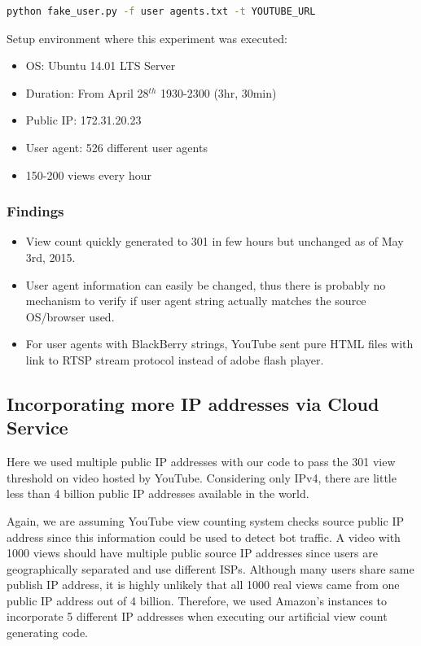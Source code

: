 \documentclass[conference]{IEEEtran}
\begin{document}
\begin{lstlisting}[frame=single, language=bash]
python fake_user.py -f user agents.txt -t YOUTUBE_URL
\end{lstlisting}

Setup environment where this experiment was executed:
\begin{itemize}
  \setlength\itemsep{-0.1em}
  \item OS: Ubuntu 14.01 LTS Server
  \item Duration: From April 28$^{th}$ 1930-2300 (3hr, 30min)
  \item Public IP: 172.31.20.23
  \item User agent: 526 different user agents
  \item 150-200 views every hour
\end{itemize}

\subsubsection*{Findings}
\begin{itemize}
  \setlength\itemsep{-0.1em}
  \item View count quickly generated to 301 in few hours but unchanged as of May 3rd, 2015.
  \item User agent information can easily be changed, thus there is probably no mechanism to verify if user agent string actually matches the source OS/browser used.
  \item For user agents with BlackBerry strings, YouTube sent pure HTML files with link to RTSP stream protocol instead of adobe flash player.
\end{itemize}


\subsection{Incorporating more IP addresses via Cloud Service}

Here we used multiple public IP addresses with our code to pass the 301 view threshold on video hosted by YouTube. Considering only IPv4, there are little less than 4 billion public IP addresses available in the world.

Again, we are assuming YouTube view counting system checks source public IP address since this information could be used to detect bot traffic. A video with 1000 views should have multiple public source IP addresses since users are geographically separated and use different ISPs. Although many users share same publish IP address, it is highly unlikely that all 1000 real views came from one public IP address out of 4 billion. Therefore, we used Amazon’s instances to incorporate 5 different IP addresses when executing our artificial view count generating code.
\end{document}
